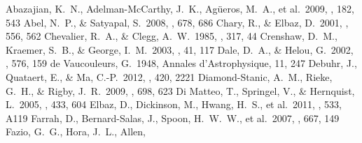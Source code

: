 \documentclass[apj]{emulateapj}
\begin{document}
\begin{thebibliography}{}
 Abazajian, K.~N.,
  Adelman-McCarthy, J.~K., Ag{\"u}eros, M.~A., et al.\ 2009, \apjs,
  182, 543
 Abel, N.~P., \& Satyapal,
  S.\ 2008, \apj, 678, 686
 Chary, R., \& Elbaz, D.\ 2001,
  \apj, 556, 562
 Chevalier, R.~A., \& Clegg,
  A.~W.\ 1985, \nat, 317, 44
 Crenshaw, D.~M., Kraemer,
  S.~B., \& George, I.~M.\ 2003, \araa, 41, 117
 Dale, D.~A., \& Helou, G.\ 2002,
  \apj, 576, 159
 de Vaucouleurs, G.\ 1948,
  Annales d'Astrophysique, 11, 247
 Debuhr, J., Quataert, E., \& Ma,
  C.-P.\ 2012, \mnras, 420, 2221
 Diamond-Stanic, A.~M.,
  Rieke, G.~H., \& Rigby, J.~R.\ 2009, \apj, 698, 623
 Di Matteo, T., Springel, V.,
  \& Hernquist, L.\ 2005, \nat, 433, 604
 Elbaz, D., Dickinson, M., Hwang,
  H.~S., et al.\ 2011, \aap, 533, A119
 Farrah, D., Bernard-Salas, J.,
  Spoon, H.~W.~W., et al.\ 2007, \apj, 667, 149
 Fazio, G.~G., Hora, J.~L., Allen,

\end{thebibliography}
\end{document}

